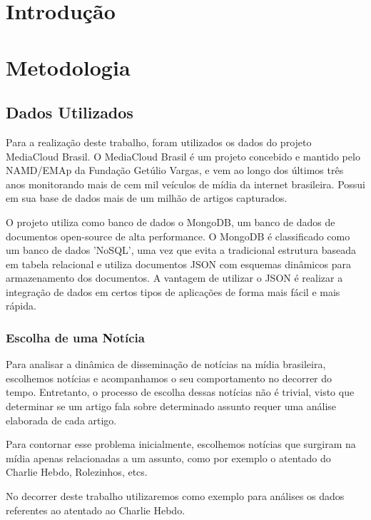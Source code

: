 \documentclass[a4paper,12pt]{article}
\begin{document}
\pagebreak


\section{Introdução}

\section{Metodologia}

\subsection{Dados Utilizados}

Para a realização deste trabalho, foram utilizados os dados do projeto MediaCloud Brasil. O MediaCloud Brasil é um projeto concebido e mantido pelo
NAMD/EMAp da Fundação Getúlio Vargas, e vem ao longo dos últimos três anos monitorando mais de cem mil veículos de mídia da internet brasileira. Possui em
sua base de dados mais de um milhão de artigos capturados.

O projeto utiliza como banco de dados o MongoDB, um banco de dados de documentos open-source de alta performance. O MongoDB é classificado como um banco de 
dados 'NoSQL', uma vez que evita a tradicional estrutura  baseada em tabela relacional e utiliza documentos JSON com esquemas dinâmicos para armazenamento 
dos documentos. A vantagem de utilizar o JSON é realizar a integração de dados em certos tipos de aplicações de forma mais fácil e mais rápida.

\subsubsection{Escolha de uma Notícia}

Para analisar a dinâmica de disseminação de notícias na mídia brasileira, escolhemos notícias e acompanhamos o seu comportamento no decorrer 
do tempo.
Entretanto, o processo de escolha dessas notícias não é trivial, visto que determinar se um artigo fala sobre determinado assunto requer
uma análise elaborada de cada artigo.

Para contornar esse problema inicialmente, escolhemos notícias que surgiram na mídia apenas relacionadas a um assunto, como por exemplo o atentado
do Charlie Hebdo, Rolezinhos, etcs.

No decorrer deste trabalho utilizaremos como exemplo para análises os dados referentes ao atentado ao Charlie Hebdo.
  
\end{document}
